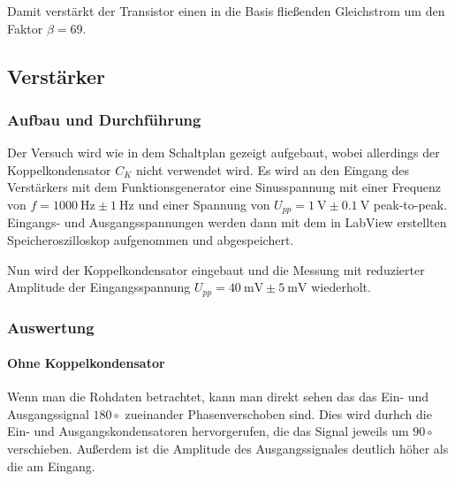\documentclass[12pt,twoside,a4paper]{scrartcl}
\begin{document}
				Damit verstärkt der Transistor einen in die Basis fließenden Gleichstrom um den Faktor $ \beta = 69$.

    \subsection{Verstärker}

			\subsubsection{Aufbau und Durchführung}

			Der Versuch wird wie in dem Schaltplan gezeigt aufgebaut, wobei allerdings der Koppelkondensator $C_K$ nicht verwendet wird.
			Es wird an den Eingang des Verstärkers mit dem Funktionsgenerator eine Sinusspannung mit einer Frequenz von $f = \SI{1000}{\hertz} \pm \SI{1}{\hertz}$
		  und einer Spannung von $U_{pp} = \SI{1}{\volt} \pm \SI{0.1}{\volt}$ peak-to-peak.
			Eingangs- und Ausgangsspannungen werden dann mit dem in LabView erstellten Speicheroszilloskop aufgenommen und abgespeichert.

			Nun wird der Koppelkondensator eingebaut und die Messung mit reduzierter Amplitude der Eingangsspannung $U_{pp} = \SI{40}{\milli \volt} \pm \SI{5}{\milli \volt}$ wiederholt.

			\subsubsection{Auswertung}

			\paragraph{Ohne Koppelkondensator}

				Wenn man die Rohdaten betrachtet, kann man direkt sehen das das Ein- und Ausgangssignal $180 \circ$ zueinander Phasenverschoben sind. Dies wird durhch die Ein- und Ausgangskondensatoren hervorgerufen, die das Signal jeweils um $90 \circ$ verschieben. Außerdem ist die Amplitude des Ausgangssignales deutlich höher als die am Eingang.
\end{document}
